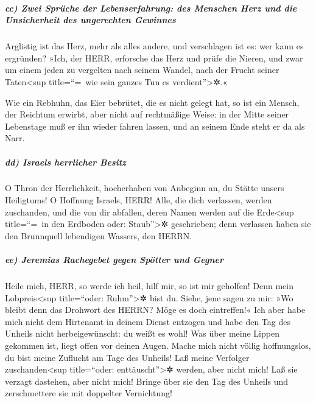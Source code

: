 \hypertarget{cc-zwei-spruxfcche-der-lebenserfahrung-des-menschen-herz-und-die-unsicherheit-des-ungerechten-gewinnes}{%
\subparagraph{cc) Zwei Sprüche der Lebenserfahrung: des Menschen Herz
und die Unsicherheit des ungerechten
Gewinnes}\label{cc-zwei-spruxfcche-der-lebenserfahrung-des-menschen-herz-und-die-unsicherheit-des-ungerechten-gewinnes}}

Arglistig ist das Herz, mehr als alles andere, und
verschlagen ist es: wer kann es ergründen? »Ich, der
HERR, erforsche das Herz und prüfe die Nieren, und zwar um einem jeden
zu vergelten nach seinem Wandel, nach der Frucht seiner
Taten\textless sup title=``=~wie sein ganzes Tun es
verdient''\textgreater✲.«

Wie ein Rebhuhn, das Eier bebrütet, die es nicht gelegt
hat, so ist ein Mensch, der Reichtum erwirbt, aber nicht auf rechtmäßige
Weise: in der Mitte seiner Lebenstage muß er ihn wieder fahren lassen,
und an seinem Ende steht er da als Narr.

\hypertarget{dd-israels-herrlicher-besitz}{%
\subparagraph{dd) Israels herrlicher
Besitz}\label{dd-israels-herrlicher-besitz}}

O Thron der Herrlichkeit, hocherhaben von Anbeginn an, du
Stätte unsers Heiligtums! O Hoffnung Israels, HERR! Alle,
die dich verlassen, werden zuschanden, und die von dir abfallen, deren
Namen werden auf die Erde\textless sup title=``=~in den Erdboden oder:
Staub''\textgreater✲ geschrieben; denn verlassen haben sie den
Brunnquell lebendigen Wassers, den HERRN.

\hypertarget{ee-jeremias-rachegebet-gegen-spuxf6tter-und-gegner}{%
\subparagraph{ee) Jeremias Rachegebet gegen Spötter und
Gegner}\label{ee-jeremias-rachegebet-gegen-spuxf6tter-und-gegner}}

Heile mich, HERR, so werde ich heil, hilf mir, so ist mir
geholfen! Denn mein Lobpreis\textless sup title=``oder:
Ruhm''\textgreater✲ bist du. Siehe, jene sagen zu mir:
»Wo bleibt denn das Drohwort des HERRN? Möge es doch eintreffen!«
Ich aber habe mich nicht dem Hirtenamt in deinem Dienst
entzogen und habe den Tag des Unheils nicht herbeigewünscht: du weißt es
wohl! Was über meine Lippen gekommen ist, liegt offen vor deinen Augen.
Mache mich nicht völlig hoffnungslos, du bist meine
Zuflucht am Tage des Unheils! Laß meine Verfolger
zuschanden\textless sup title=``oder: enttäuscht''\textgreater✲ werden,
aber nicht mich! Laß sie verzagt dastehen, aber nicht mich! Bringe über
sie den Tag des Unheils und zerschmettere sie mit doppelter Vernichtung!

